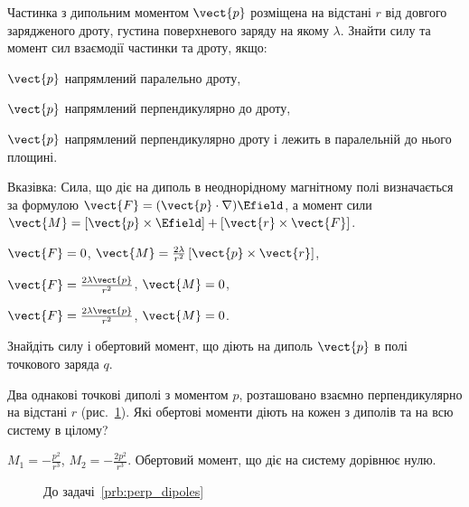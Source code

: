 \begin{problem}\label{wire-dipole}
Частинка з дипольним моментом $\vect{p}$ розміщена на відстані $r$ від довгого зарядженого дроту, густина поверхневого заряду на якому $\lambda$. Знайти силу та момент сил взаємодії частинки та дроту, якщо:
\begin{enumerate*}[label=\alph*)]
	\item $\vect{p}$ напрямлений паралельно дроту,
	\item $\vect{p}$ напрямлений перпендикулярно до дроту,
	\item $\vect{p}$ напрямлений перпендикулярно дроту і лежить в паралельній до нього площині.
\end{enumerate*}
\begin{solution}
	Вказівка: Сила, що діє на диполь в неоднорідному магнітному полі визначається за формулою $\vect{F} = (\vect{p}\cdot\nabla)\Efield$, а момент сили $\vect{M} = \left[ \vect{p}\times\Efield\right]  + \left[ \vect{r}\times\vect{F}\right] $.

	\begin{enumerate*}[label=\alph*)]
		\item $\vect{F} = 0$, $\vect{M} = \frac{2\lambda}{r^2} \left[ \vect{p}\times\vect{r}\right] $,
		\item $\vect{F} = \frac{2\lambda \vect{p}}{r^2}$, $\vect{M} = 0$,
		\item $\vect{F} = \frac{2\lambda \vect{p}}{r^2}$, $\vect{M} = 0$.
	\end{enumerate*}
\end{solution}
\end{problem}

\begin{problem}
    Знайдіть силу і обертовий момент, що діють на диполь $\vect{p}$ в полі точкового заряда $q$.
\end{problem}


\begin{problem}\label{prb:perp_dipoles}
Два однакові точкові диполі з моментом $p$, розташовано взаємно перпендикулярно на відстані $r$ (рис.~\ref{perp_dipoles}). Які обертові моменти діють на  кожен з диполів та на всю систему в цілому?
\begin{solution}
	$M_1 = -\frac{p^2}{r^3}$, $M_2 = -\frac{2p^2}{r^3}$. Обертовий момент, що діє на систему дорівнює нулю.
\end{solution}
\end{problem}
\begin{figure}[h!]\centering
	\caption{До задачі~\ref{prb:perp_dipoles}}
	\label{perp_dipoles}
\end{figure}

